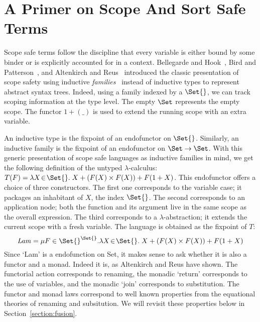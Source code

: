 

\section{A Primer on Scope And Sort Safe Terms}\label{section:primer-term}

Scope safe terms follow the discipline that every variable is
either bound by some binder or is explicitly accounted for in a
context. Bellegarde and Hook~\citeyear{BELLEGARDE1994287}, Bird and Patterson~\citeyear{bird_paterson_1999},
and Altenkirch and Reus~\citeyear{altenkirch1999monadic} introduced the
classic presentation of scope safety using inductive
\emph{families}~\cite{dybjer1994inductive} instead of inductive types to
represent abstract syntax trees. Indeed, using a family indexed by a $\Set{}$,
we can track scoping information at the type level. The empty $\Set$ represents the empty scope. The functor
$1 + (\_)$ is used to extend the running scope with an extra variable.

An inductive type is the fixpoint of an endofunctor on $\Set{}$.
Similarly, an inductive family is the fixpoint of an
endofunctor on $\Set \to \Set$. With this generic presentation of scope safe
languages as inductive families in mind, we get the following definition of
the untyped $\lambda$-calculus:
$T(F) = \lambda X \!\in\! \Set{}.\; X + (F(X) \times F(X)) + F(1 + X)$.
This endofunctor offers a choice of three constructors.
The first one corresponds to the variable
case; it packages an inhabitant of $X$, the index $\Set{}$. The second corresponds
to an application node; both the function and its argument live in the same
scope as the overall expression. The third corresponds to
a $\lambda$-abstraction; it extends the current scope with a fresh variable.
The language is obtained as the fixpoint of $T$:
\[
   \mathit{Lam} = \mu F \in \Set{}^{\Set{}}.
   \lambda X \!\in\! \Set{}.\; X + (F(X) \times F(X)) + F(1 + X)
\]
Since `Lam' is a endofunction on Set, it makes
sense to ask whether it is also a functor and a monad. Indeed it is,
as Altenkirch and Reus have shown. The functorial action corresponds
to renaming, the monadic `return' corresponds to the use of variables,
and the monadic `join' corresponds to substitution. The functor and
monad laws correspond to well known properties from the equational
theories of renaming and subsitution. We will revisit these properties
below in Section~\ref{section:fusion}.

